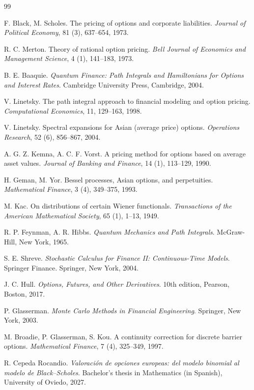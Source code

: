 \begin{thebibliography}{99}

F. Black, M. Scholes.
The pricing of options and corporate liabilities.
\emph{Journal of Political Economy}, 81 (3), 637--654, 1973.

R. C. Merton.
Theory of rational option pricing.
\emph{Bell Journal of Economics and Management Science}, 4 (1),
141--183, 1973.

B. E. Baaquie.
\emph{Quantum Finance: Path Integrals and Hamiltonians for Options
and Interest Rates}.
Cambridge University Press, Cambridge, 2004.

V. Linetsky.
The path integral approach to financial modeling and option pricing.
\emph{Computational Economics}, 11, 129--163, 1998.

V. Linetsky.
Spectral expansions for Asian (average price) options.
\emph{Operations Research}, 52 (6), 856--867, 2004.

A. G. Z. Kemna, A. C. F. Vorst.
A pricing method for options based on average asset values.
\emph{Journal of Banking and Finance}, 14 (1), 113--129, 1990.

H. Geman, M. Yor.
Bessel processes, Asian options, and perpetuities.
\emph{Mathematical Finance}, 3 (4), 349--375, 1993.

M. Kac.
On distributions of certain Wiener functionals.
\emph{Transactions of the American Mathematical Society}, 65 (1),
1--13, 1949.

R. P. Feynman, A. R. Hibbs.
\emph{Quantum Mechanics and Path Integrals}.
McGraw-Hill, New York, 1965.

S. E. Shreve.
\emph{Stochastic Calculus for Finance II: Continuous-Time Models}.
Springer Finance. Springer, New York, 2004.

J. C. Hull.
\emph{Options, Futures, and Other Derivatives}.
10th edition, Pearson, Boston, 2017.

P. Glasserman.
\emph{Monte Carlo Methods in Financial Engineering}.
Springer, New York, 2003.

M. Broadie, P. Glasserman, S. Kou.
A continuity correction for discrete barrier options.
\emph{Mathematical Finance}, 7 (4), 325--349, 1997.

R. Cepeda Rocandio.
\emph{Valoración de opciones europeas: del modelo binomial al modelo
de Black--Scholes}.
Bachelor's thesis in Mathematics (in Spanish), University of Oviedo, 2027.

\end{thebibliography}
